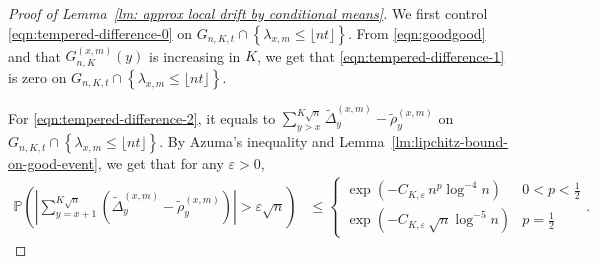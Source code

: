 \documentclass[twoside,12pt, a4paper]{article}
\numberwithin{equation}{section}
\theoremstyle{remark}
\begin{document}
	\begin{proof}[Proof of Lemma~\ref{lm: approx local drift by conditional means}]
		We first control \eqref{eqn:tempered-difference-0} on $G_{n, K, t} \cap \left\{\lambda_{x,m} \leq\lfloor nt \rfloor \right\}$. From \eqref{eqn:goodgood} and that $G_{n,K}^{(x,m)}(y)$ is increasing in $K$, we get that  \eqref{eqn:tempered-difference-1} is zero on $G_{n, K, t} \cap \left\{\lambda_{x,m} \leq\lfloor nt \rfloor \right\}$. 
		
		For \eqref{eqn:tempered-difference-2}, it equals to
		$
		\sum_{y > x}^{K\sqrt{n}} \tilde \Delta_{y}^{(x,m)} - \tilde\rho_y^{(x,m)}
		$
		on $G_{n, K, t} \cap \left\{\lambda_{x,m} \leq\lfloor nt \rfloor \right\}$. By Azuma's inequality and Lemma~\ref{lm:lipchitz-bound-on-good-event}, we get that for any $\varepsilon>0$,
		\begin{align}
			\mathbb{P}\left( \left| \sum_{y = x + 1}^{K \sqrt{n} } (\tilde\Delta_y^{(x,m)} - \tilde\rho_y^{(x,m)}) \right| > \varepsilon \sqrt{n}  \right) 
			&
			\label{eqn:azuma-drift-martingale}
			\le \begin{cases}
				\exp\left( - C_{K, \varepsilon} \, n^{p } \log^{-4} n \right)
				& 0 < p < \frac{1}{2} \\
				\exp\left( - C_{K, \varepsilon} \, \sqrt{n}  \log^{-5} n \right)
				& p = \frac{1}{2}
			\end{cases}
			.\end{align}
		

\end{proof}
\end{document}
